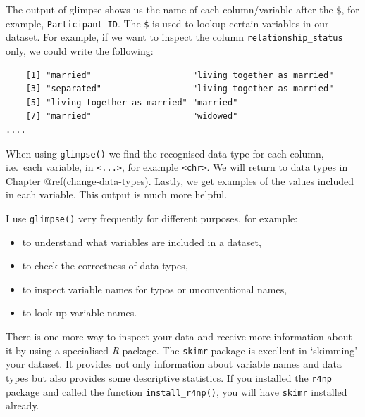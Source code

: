 \documentclass[
  letterpaper,
]{krantz}
\makeatletter
\newenvironment{Shaded}{\begin{snugshade}}{\end{snugshade}}
\newcommand{\NormalTok}[1]{\textcolor[rgb]{0.00,0.23,0.31}{#1}}
\newcommand{\SpecialCharTok}[1]{\textcolor[rgb]{0.37,0.37,0.37}{#1}}
\newenvironment{kframe}{%
\medskip{}
\setlength{\fboxsep}{.8em}
 \def\at@end@of@kframe{}%
 \ifinner\ifhmode%
  \def\at@end@of@kframe{\end{minipage}}%
  \begin{minipage}{\columnwidth}%
 \fi\fi%
 \def\FrameCommand##1{\hskip\@totalleftmargin \hskip-\fboxsep
 \colorbox{shadecolor}{##1}\hskip-\fboxsep
     \hskip-\linewidth \hskip-\@totalleftmargin \hskip\columnwidth}%
 \MakeFramed {\advance\hsize-\width
   \@totalleftmargin\z@ \linewidth\hsize
   \@setminipage}}%
 {\par\unskip\endMakeFramed%
 \at@end@of@kframe}
\renewenvironment{Shaded}{\begin{kframe}}{\end{kframe}}
\makeatother
\begin{document}
The output of glimpse shows us the name of each column/variable after
the \texttt{\$}, for example,
\texttt{\textasciigrave{}Participant\ ID\textasciigrave{}}. The
\texttt{\$} is used to lookup certain variables in our dataset. For
example, if we want to inspect the column \texttt{relationship\_status}
only, we could write the following:

\begin{Shaded}
\end{Shaded}

\begin{verbatim}
    [1] "married"                    "living together as married"
    [3] "separated"                  "living together as married"
    [5] "living together as married" "married"                   
    [7] "married"                    "widowed"                   
....
\end{verbatim}

When using \texttt{glimpse()} we find the recognised data type for each
column, i.e.~each variable, in \texttt{\textless{}...\textgreater{}},
for example \texttt{\textless{}chr\textgreater{}}. We will return to
data types in Chapter @ref(change-data-types). Lastly, we get examples
of the values included in each variable. This output is much more
helpful.

I use \texttt{glimpse()} very frequently for different purposes, for
example:

\begin{itemize}
\item
  to understand what variables are included in a dataset,
\item
  to check the correctness of data types,
\item
  to inspect variable names for typos or unconventional names,
\item
  to look up variable names.
\end{itemize}

There is one more way to inspect your data and receive more information
about it by using a specialised \emph{R} package. The \texttt{skimr}
package is excellent in `skimming' your dataset. It provides not only
information about variable names and data types but also provides some
descriptive statistics. If you installed the \texttt{r4np} package and
called the function \texttt{install\_r4np()}, you will have
\texttt{skimr} installed already.
\end{document}
